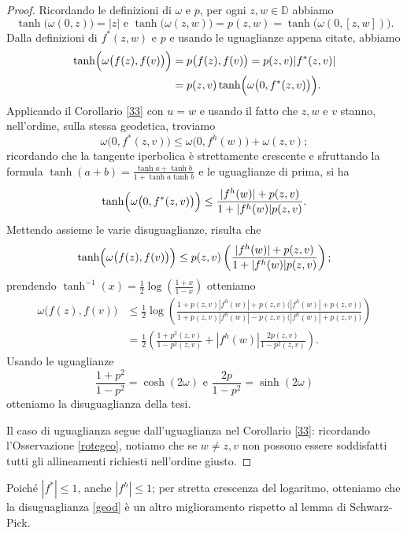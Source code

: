 \begin{proof}
  Ricordando le definizioni di $\omega$ e $p$, per ogni $z,w \in \mathbb{D}$ abbiamo
  $$\tanh\bigl(\omega(0,z)\bigr)=|z|\text{ e }\tanh\bigl(\omega(z,w)\bigr)=p(z,w)=\tanh\bigl(\omega(0,[z,w])\bigl).$$
  Dalla definizioni di $f^*(z,w)$ e $p$ e usando le uguaglianze appena citate, abbiamo
  \begin{align*}
    \tanh\Bigl(\omega\bigl(f(z),f(v)\bigr)\Bigr)&=p\bigl(f(z),f(v)\bigr)=p(z,v)|f^*(z,v)| \\
    &=p(z,v)\tanh\Bigl(\omega\bigl(0,f^*(z,v)\bigr)\Bigr).
  \end{align*}
  Applicando il Corollario \ref{33} con $u=w$ e usando il fatto che $z,w$ e $v$ stanno, nell'ordine, sulla stessa geodetica, troviamo
  $$\omega\bigl(0,f^*(z,v)\bigr) \le \omega\bigl(0,f^h(w)\bigr)+\omega(z,v);$$
  ricordando che la tangente iperbolica è strettamente crescente e sfruttando la formula $\tanh(a+b)=\frac{\tanh{a}+\tanh{b}}{1+\tanh{a}\tanh{b}}$ e le uguaglianze di prima, si ha
  $$\tanh\Bigl(\omega\bigl(0,f^*(z,v)\bigr)\Bigr) \le\frac{|f^h(w)|+p(z,v)}{1+|f^h(w)|p(z,v)}.$$
  Mettendo assieme le varie disuguaglianze, risulta che
  $$\tanh\Bigl(\omega\bigl(f(z),f(v)\bigr)\Bigr) \le p(z,v)\left(\frac{|f^h(w)|+p(z,v)}{1+|f^h(w)|p(z,v)}\right);$$
  prendendo $\tanh^{-1}(x)=\frac{1}{2}\log\left(\frac{1+x}{1-x}\right)$ otteniamo
  \begin{align*}
    \omega\bigl(f(z),f(v)\bigr) & \le \frac{1}{2}\log\left(\frac{1+p(z,v)|f^h(w)|+p(z,v)\bigl(|f^h(w)|+p(z,v)\bigr)}{1+p(z,v)|f^h(w)|-p(z,v)\bigl(|f^h(w)|+p(z,v)\bigr)}\right) \\
    & =\frac{1}{2}\left(\frac{1+p^2(z,v)}{1-p^2(z,v)}+|f^h(w)|\frac{2p(z,v)}{1-p^2(z,v)}\right).
  \end{align*}
  Usando le uguaglianze
  $$\frac{1+p^2}{1-p^2}=\cosh(2\omega) \text{ e } \frac{2p}{1-p^2}=\sinh(2\omega)$$
  otteniamo la disuguaglianza della tesi.

  Il caso di uguaglianza segue dall'uguaglianza nel Corollario \ref{33}: ricordando l'Osservazione \ref{rotegeo}, notiamo che se $w\not=z,v$ non possono essere soddisfatti tutti gli allineamenti richiesti nell'ordine giusto.
\end{proof}

\begin{oss}
  Poiché $|f^*| \le 1$, anche $|f^h| \le 1$; per stretta crescenza del logaritmo, otteniamo che la disuguaglianza \eqref{geod} è un altro miglioramento rispetto al lemma di Schwarz-Pick.
\end{oss}

